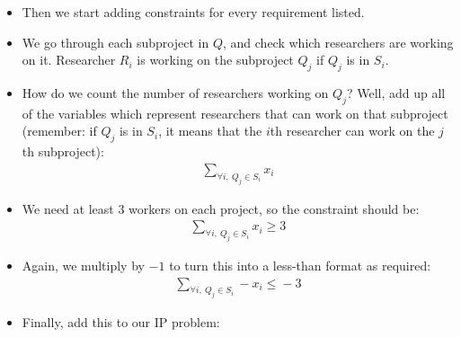 
\begin{itemize}
    \item Then we start adding constraints for every requirement listed.
\end{itemize}


\begin{itemize}
    \item We go through each subproject in $Q$, and check which researchers are working on it. Researcher $R_i$ is working on the subproject $Q_j$ if $Q_j$ is in $S_i$.
    \item How do we count the number of researchers working on $Q_j$? Well, add up all of the variables which represent researchers that can work on that subproject (remember: if $Q_j$ is in $S_i$, it means that the $i$th researcher can work on the $j$th subproject):
    \begin{align*}
        \sum\limits_{\forall{}i,~Q_j\in{}S_i}x_i
    \end{align*}
    \item We need at least $3$ workers on each project, so the constraint should be:
    \begin{align*}
        \sum\limits_{\forall{}i,~Q_j\in{}S_i}x_i \geq{} 3
    \end{align*}
    \item Again, we multiply by $-1$ to turn this into a less-than format as required:
    \begin{align*}
        \sum\limits_{\forall{}i,~Q_j\in{}S_i}-x_i \leq{} -3
    \end{align*}
    \item Finally, add this to our IP problem:
\end{itemize}

